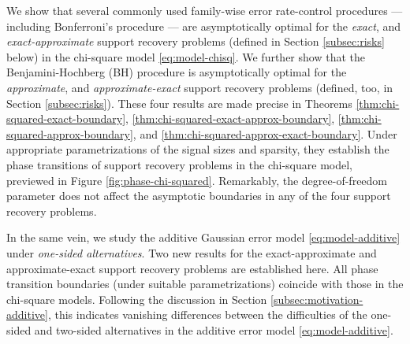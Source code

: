 We show that several commonly used family-wise error rate-control procedures --- including Bonferroni's procedure \cite{dunn1961multiple} --- are asymptotically optimal for the \emph{exact}, and \emph{exact-approximate} support recovery problems (defined in Section \ref{subsec:risks} below) in the chi-square model \eqref{eq:model-chisq}.
We further show that the Benjamini-Hochberg (BH) procedure \cite{benjamini1995controlling} is asymptotically optimal for the \emph{approximate}, and \emph{approximate-exact} support recovery problems (defined, too, in Section \ref{subsec:risks}).
These four results are made precise in Theorems \ref{thm:chi-squared-exact-boundary}, \ref{thm:chi-squared-exact-approx-boundary}, \ref{thm:chi-squared-approx-boundary}, and \ref{thm:chi-squared-approx-exact-boundary}.
Under appropriate parametrizations of the signal sizes and sparsity, they establish the phase transitions of support recovery problems in the chi-square model, previewed in Figure \ref{fig:phase-chi-squared}.
Remarkably, the degree-of-freedom parameter does not affect the asymptotic boundaries in any of the four support recovery problems.

In the same vein, we study the additive Gaussian error model \eqref{eq:model-additive} under \emph{one-sided alternatives}. 
Two new results for the exact-approximate and approximate-exact support recovery problems are established here.
All phase transition boundaries (under suitable parametrizations) coincide with those in the chi-square models.
Following the discussion in Section \ref{subsec:motivation-additive}, this indicates vanishing differences between the difficulties of the one-sided and two-sided alternatives in the additive error model \eqref{eq:model-additive}.



